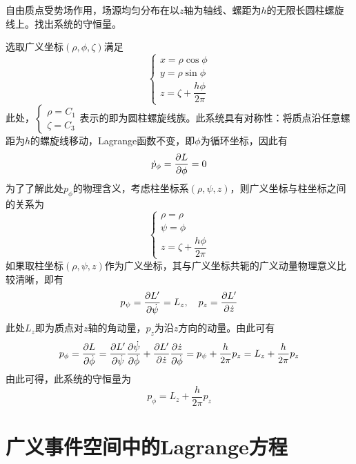 \begin{example}
自由质点受势场作用，场源均匀分布在以$z$轴为轴线、螺距为$h$的无限长圆柱螺旋线上。找出系统的守恒量。
\end{example}
\begin{solution}
选取广义坐标$(\rho,\phi,\zeta)$满足
\begin{equation*}
\begin{cases}
	x = \rho \cos \phi \\
	y = \rho \sin \phi \\
	z = \zeta + \dfrac{h\phi}{2\pi}
\end{cases}
\end{equation*}
此处，$\begin{cases} \rho = C_1 \\ \zeta = C_3 \end{cases}$表示的即为圆柱螺旋线族。此系统具有对称性：将质点沿任意螺距为$h$的螺旋线移动，Lagrange函数不变，即$\phi$为循环坐标，因此有
\begin{equation*}
	\dot{p}_\phi = \frac{\partial L}{\partial \phi} = 0
\end{equation*}
为了了解此处$p_\phi$的物理含义，考虑柱坐标系$(\rho,\psi,z)$，则广义坐标与柱坐标之间的关系为
\begin{equation*}
\begin{cases}
	\rho = \rho \\
	\psi = \phi \\
	z = \zeta + \dfrac{h\phi}{2\pi}
\end{cases}
\end{equation*}
如果取柱坐标$(\rho,\psi,z)$作为广义坐标，其与广义坐标共轭的广义动量物理意义比较清晰，即有
\begin{equation*}
	p_\psi = \frac{\partial L'}{\partial \dot{\psi}} = L_z,\quad p_z = \frac{\partial L'}{\partial \dot{z}}
\end{equation*}
此处$L_z$即为质点对$z$轴的角动量，$p_z$为沿$z$方向的动量。由此可有
\begin{equation*}
	p_\phi = \frac{\partial L}{\partial \dot{\phi}} = \frac{\partial L'}{\partial \dot{\psi}} \frac{\partial \dot{\psi}}{\partial \dot{\phi}} + \frac{\partial L'}{\partial \dot{z}} \frac{\partial \dot{z}}{\partial \dot{\phi}} = p_\psi + \frac{h}{2\pi} p_z = L_z + \frac{h}{2\pi} p_z
\end{equation*}
由此可得，此系统的守恒量为
\begin{equation*}
	p_\phi = L_z + \frac{h}{2\pi} p_z
\end{equation*}
\end{solution}

\section{广义事件空间中的Lagrange方程}

